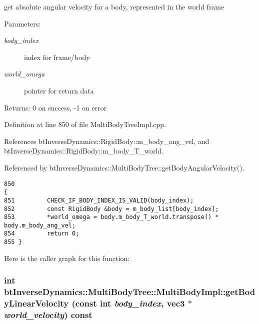 get absolute angular velocity for a body, represented in the world frame \begin{Desc}
\item[Parameters:]
\begin{description}
\item[{\em body\_\-index}]index for frame/body \item[{\em world\_\-omega}]pointer for return data \end{description}
\end{Desc}
\begin{Desc}
\item[Returns:]0 on success, -1 on error \end{Desc}
 

Definition at line 850 of file MultiBodyTreeImpl.cpp.

References btInverseDynamics::RigidBody::m\_\-body\_\-ang\_\-vel, and btInverseDynamics::RigidBody::m\_\-body\_\-T\_\-world.

Referenced by btInverseDynamics::MultiBodyTree::getBodyAngularVelocity().

\begin{Code}\begin{verbatim}850                                                                                               {
851         CHECK_IF_BODY_INDEX_IS_VALID(body_index);
852         const RigidBody &body = m_body_list[body_index];
853         *world_omega = body.m_body_T_world.transpose() * body.m_body_ang_vel;
854         return 0;
855 }
\end{verbatim}
\end{Code}




Here is the caller graph for this function:\hypertarget{classbt_inverse_dynamics_1_1_multi_body_tree_1_1_multi_body_impl_87604495df09957e2ecd33336bcb8c0f}{
\subsubsection[getBodyLinearVelocity]{\setlength{\rightskip}{0pt plus 5cm}int btInverseDynamics::MultiBodyTree::MultiBodyImpl::getBodyLinearVelocity (const int {\em body\_\-index}, \/  {\bf vec3} $\ast$ {\em world\_\-velocity}) const}}
\label{classbt_inverse_dynamics_1_1_multi_body_tree_1_1_multi_body_impl_87604495df09957e2ecd33336bcb8c0f}


